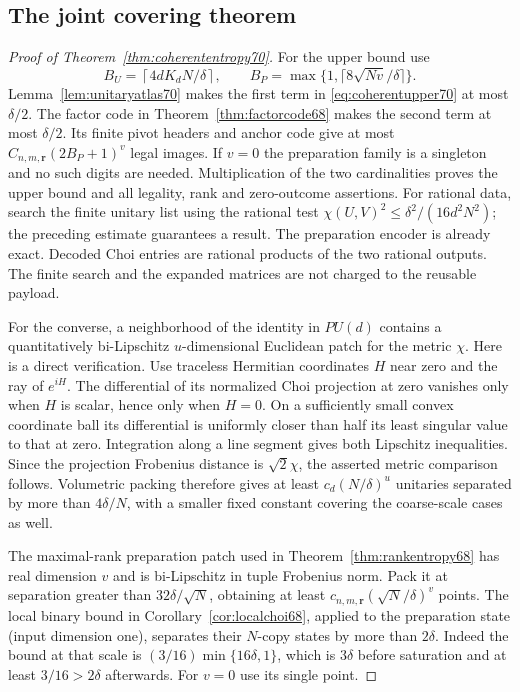 \subsection{The joint covering theorem}
\begin{proof}[Proof of Theorem~\ref{thm:coherententropy70}]
For the upper bound use
\[
 B_U=\left\lceil4dK_dN/\delta\right\rceil,
 \qquad B_P=\max\{1,\lceil8\sqrt{Nv}/\delta\rceil\}.
\]
Lemma~\ref{lem:unitaryatlas70} makes the first term in
\eqref{eq:coherentupper70} at most $\delta/2$.
The factor code in Theorem~\ref{thm:factorcode68} makes the second term
at most $\delta/2$. Its finite pivot headers and anchor code give at most
$C_{n,m,\boldsymbol r}(2B_P+1)^v$ legal images. If $v=0$ the preparation
family is a singleton and no such digits are needed. Multiplication of
the two cardinalities proves the upper bound and all legality, rank and
zero-outcome assertions. For rational data, search the finite unitary
list using the rational test
$\chi(U,V)^2\le\delta^2/(16d^2N^2)$; the preceding estimate guarantees
a result. The preparation encoder is already exact. Decoded Choi entries
are rational products of the two rational outputs. The finite search and
the expanded matrices are not charged to the reusable payload.

For the converse, a neighborhood of the identity in $PU(d)$ contains a
quantitatively bi-Lipschitz $u$-dimensional Euclidean patch for the metric
$\chi$. Here is a direct verification. Use traceless Hermitian coordinates
$H$ near zero and the ray of $e^{iH}$. The differential of its normalized
Choi projection at zero vanishes only when $H$ is scalar, hence only when
$H=0$. On a sufficiently small convex coordinate ball its differential
is uniformly closer than half its least singular value to that at zero.
Integration along a line segment gives both Lipschitz inequalities.
Since the projection Frobenius distance is $\sqrt2\chi$, the asserted
metric comparison follows. Volumetric packing therefore gives at least
$c_d(N/\delta)^u$ unitaries separated by more than $4\delta/N$, with
a smaller fixed constant covering the coarse-scale cases as well.

The maximal-rank preparation patch used in
Theorem~\ref{thm:rankentropy68} has real dimension $v$ and is
bi-Lipschitz in tuple Frobenius norm. Pack it at separation greater than
$32\delta/\sqrt N$, obtaining at least
$c_{n,m,\boldsymbol r}(\sqrt N/\delta)^v$ points. The local binary
bound in Corollary~\ref{cor:localchoi68}, applied to the preparation
state (input dimension one), separates their $N$-copy states by more
than $2\delta$. Indeed the bound at that scale is
$(3/16)\min\{16\delta,1\}$, which is $3\delta$ before saturation
and at least $3/16>2\delta$ afterwards. For $v=0$ use its single point.


\end{proof}

